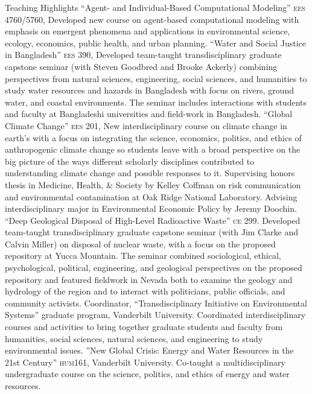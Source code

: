 \begin{rubric}{Teaching Highlights}%
\entry*[2015--]``Agent- and Individual-Based Computational Modeling'' \textsc{ees 4760/5760}, Developed new course on agent-based computational modeling with emphasis on emergent phenomena and applications in environmental science, ecology, economics, public health, and urban planning.
\entry*[2010--2014]``Water and Social Justice in Bangladesh'' \textsc{ees 390}, Developed team-taught transdisciplinary graduate capstone seminar (with Steven Goodbred and Brooke Ackerly) combining perspectives from natural sciences, engineering, social sciences, and humanities to study water resources and hazards in Bangladesh with focus on rivers, ground water, and coastal environments. The seminar includes interactions with students and faculty at Bangladeshi universities and field-work in Bangladesh.
\entry*[2008--]``Global Climate Change'' \textsc{ees 201}, New interdisciplinary course on climate change in earth's with a focus on integrating the science, economics, politics, and ethics of anthropogenic climate change so students leave with a broad perspective on the big picture of the ways different scholarly disciplines contributed to understanding climate change and possible responses to it.
\entry*[2008--] Supervising honors thesis in Medicine, Health, \& Society by Kelley Coffman on risk communication and environmental contamination at Oak Ridge National Laboratory.
\entry*[2008--] Advising interdisciplinary major in Environmental Economic Policy by Jeremy Doochin.
\entry*[2006--2008] ``Deep Geological Disposal of High-Level Radioactive Waste'' \textsc{ce 299}. Developed team-taught transdisciplinary graduate capstone seminar (with Jim Clarke and Calvin Miller) on disposal of nuclear waste, with a focus on the proposed repository at Yucca Mountain. The seminar combined sociological, ethical, psychological, political, engineering, and geological perspectives on the proposed repository and featured fieldwork in Nevada both to examine the geology and hydrology of the region and to interact with politicians, public officials, and community activists.
\entry*[2006--]Coordinator, ``Transdisciplinary Initiative on Environmental Systems'' graduate program, Vanderbilt University. Coordinated interdisciplinary courses and activities to bring together graduate students and faculty from humanities, social sciences, natural sciences, and engineering to study environmental issues.
\entry*[2005]''New Global Crisis: Energy and Water Resources in the 21st Century'' \textsc{hum161}, Vanderbilt University. Co-taught a multidisciplinary undergraduate course on the science, politics, and ethics of energy and water resources.

\end{rubric}
